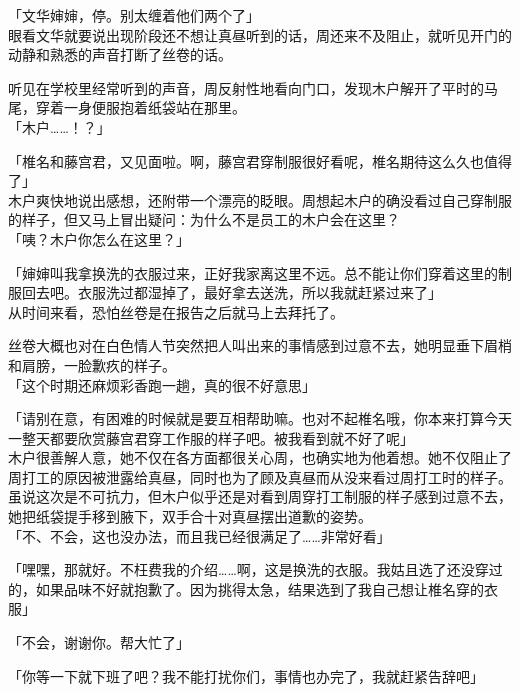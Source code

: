 「文华婶婶，停。别太缠着他们两个了」\\

眼看文华就要说出现阶段还不想让真昼听到的话，周还来不及阻止，就听见开门的动静和熟悉的声音打断了丝卷的话。

听见在学校里经常听到的声音，周反射性地看向门口，发现木户解开了平时的马尾，穿着一身便服抱着纸袋站在那里。\\

「木户……！？」

「椎名和藤宫君，又见面啦。啊，藤宫君穿制服很好看呢，椎名期待这么久也值得了」\\

木户爽快地说出感想，还附带一个漂亮的眨眼。周想起木户的确没看过自己穿制服的样子，但又马上冒出疑问：为什么不是员工的木户会在这里？\\

「咦？木户你怎么在这里？」

「婶婶叫我拿换洗的衣服过来，正好我家离这里不远。总不能让你们穿着这里的制服回去吧。衣服洗过都湿掉了，最好拿去送洗，所以我就赶紧过来了」\\

从时间来看，恐怕丝卷是在报告之后就马上去拜托了。

丝卷大概也对在白色情人节突然把人叫出来的事情感到过意不去，她明显垂下眉梢和肩膀，一脸歉疚的样子。\\

「这个时期还麻烦彩香跑一趟，真的很不好意思」

「请别在意，有困难的时候就是要互相帮助嘛。也对不起椎名哦，你本来打算今天一整天都要欣赏藤宫君穿工作服的样子吧。被我看到就不好了呢」\\

木户很善解人意，她不仅在各方面都很关心周，也确实地为他着想。她不仅阻止了周打工的原因被泄露给真昼，同时也为了顾及真昼而从没来看过周打工时的样子。\\

虽说这次是不可抗力，但木户似乎还是对看到周穿打工制服的样子感到过意不去，她把纸袋提手移到腋下，双手合十对真昼摆出道歉的姿势。\\

「不、不会，这也没办法，而且我已经很满足了……非常好看」

「嘿嘿，那就好。不枉费我的介绍……啊，这是换洗的衣服。我姑且选了还没穿过的，如果品味不好就抱歉了。因为挑得太急，结果选到了我自己想让椎名穿的衣服」

「不会，谢谢你。帮大忙了」

「你等一下就下班了吧？我不能打扰你们，事情也办完了，我就赶紧告辞吧」\\

